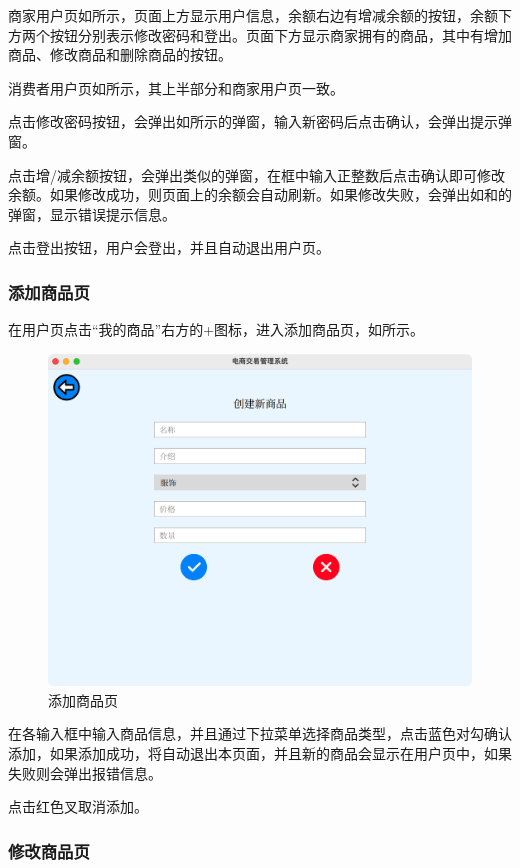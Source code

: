 \documentclass[lang=cn,11pt,a4paper,cite=authornum]{paper}
\begin{document}
商家用户页如所示，页面上方显示用户信息，余额右边有增减余额的按钮，余额下方两个按钮分别表示修改密码和登出。页面下方显示商家拥有的商品，其中有增加商品、修改商品和删除商品的按钮。

消费者用户页如所示，其上半部分和商家用户页一致。

点击修改密码按钮，会弹出如所示的弹窗，输入新密码后点击确认，会弹出提示弹窗。

点击增/减余额按钮，会弹出类似的弹窗，在框中输入正整数后点击确认即可修改余额。如果修改成功，则页面上的余额会自动刷新。如果修改失败，会弹出如和的弹窗，显示错误提示信息。

点击登出按钮，用户会登出，并且自动退出用户页。

\subsubsection{添加商品页}

在用户页点击“我的商品”右方的+图标，进入添加商品页，如所示。

\begin{figure}[htbp]
    \centering
    \includegraphics[width=0.7\linewidth]{./Images/newcom.png}
    \caption{添加商品页\label{fig:newcom}}
\end{figure}

在各输入框中输入商品信息，并且通过下拉菜单选择商品类型，点击蓝色对勾确认添加，如果添加成功，将自动退出本页面，并且新的商品会显示在用户页中，如果失败则会弹出报错信息。

点击红色叉取消添加。

\subsubsection{修改商品页}
\end{document}
